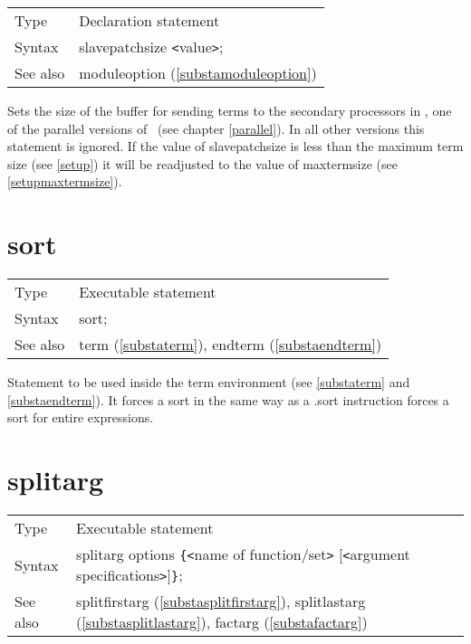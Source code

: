 \noindent \begin{tabular}{ll}
Type & Declaration statement\\
Syntax & slavepatchsize {\tt<}value{\tt>};
\\ See also & moduleoption (\ref{substamoduleoption})
\end{tabular}\vspace{4mm}

\noindent Sets the size of the buffer for sending 
terms to the secondary processors in \ParFORM{}, one of the 
parallel versions of \FORM\ (see chapter \ref{parallel}). In 
all other versions this statement is ignored. If the value of 
slavepatchsize is less than the maximum term size (see \ref{setup}) it will 
be readjusted to the value of maxtermsize (see 
\ref{setupmaxtermsize}). \vspace{10mm}


\section{sort}
\label{substasort}

\noindent \begin{tabular}{ll}
Type & Executable statement\\
Syntax & sort;
\\ See also & term (\ref{substaterm}), endterm (\ref{substaendterm})
\end{tabular} \vspace{4mm}

\noindent Statement to be used inside the term 
environment (see \ref{substaterm} and 
\ref{substaendterm}). It forces a sort in the same way as a 
.sort instruction forces a sort for entire expressions. 
\vspace{10mm}


\section{splitarg}
\label{substasplitarg}

\noindent \begin{tabular}{ll}
Type & Executable statement\\
Syntax & splitarg options \verb:{:{\tt<}name of function/set{\tt>}
             [{\tt<}argument specifications{\tt>}]\verb:}:;
\\ See also & splitfirstarg (\ref{substasplitfirstarg}),
             splitlastarg (\ref{substasplitlastarg}),
             factarg (\ref{substafactarg})
\end{tabular}\vspace{4mm}


